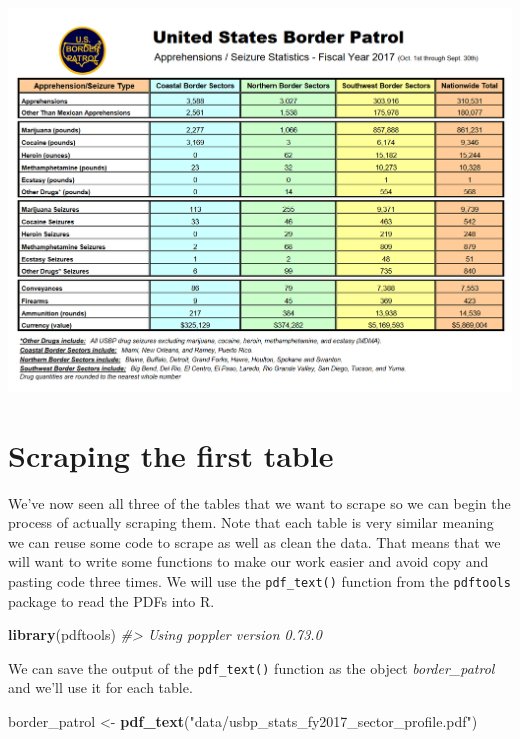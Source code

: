 \documentclass[
  12pt,
]{book}
\newenvironment{Shaded}{\begin{snugshade}}{\end{snugshade}}
\newcommand{\CommentTok}[1]{\textcolor[rgb]{0.37,0.37,0.37}{\textit{#1}}}
\newcommand{\KeywordTok}[1]{\textcolor[rgb]{0.27,0.27,0.27}{\textbf{#1}}}
\newcommand{\NormalTok}[1]{#1}
\newcommand{\StringTok}[1]{\textcolor[rgb]{0.5,0.5,0.5}{#1}}
\begin{document}
\includegraphics{images/pdf_table_4.PNG}

\hypertarget{scraping-the-first-table}{%
\section{Scraping the first table}\label{scraping-the-first-table}}

We've now seen all three of the tables that we want to scrape so we can begin the process of actually scraping them. Note that each table is very similar meaning we can reuse some code to scrape as well as clean the data. That means that we will want to write some functions to make our work easier and avoid copy and pasting code three times. We will use the \texttt{pdf\_text()} function from the \texttt{pdftools} package to read the PDFs into R.

\begin{Shaded}
\begin{Highlighting}[]
\KeywordTok{library}\NormalTok{(pdftools)}
\CommentTok{\#> Using poppler version 0.73.0}
\end{Highlighting}
\end{Shaded}

We can save the output of the \texttt{pdf\_text()} function as the object \emph{border\_patrol} and we'll use it for each table.

\begin{Shaded}
\begin{Highlighting}[]
\NormalTok{border\_patrol <{-}}\StringTok{ }\KeywordTok{pdf\_text}\NormalTok{(}\StringTok{"data/usbp\_stats\_fy2017\_sector\_profile.pdf"}\NormalTok{)}
\end{Highlighting}
\end{Shaded}
\end{document}
